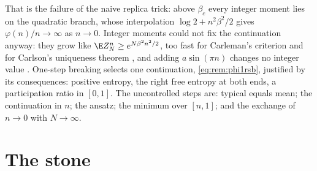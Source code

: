 \begin{refsection}
That is the failure of the naive replica trick: above $\beta_c$ every integer moment lies on the quadratic branch, whose interpolation $\log2+n^2\beta^2/2$ gives $\varphi(n)/n\to\infty$ as $n\to0$. Integer moments could not fix the continuation anyway: they grow like $\E Z_N^n\ge e^{N\beta^2n^2/2}$, too fast for Carleman's criterion and for Carlson's uniqueness theorem \parencite{OgureKabashima2009a}, and adding $a\sin(\pi n)$ changes no integer value \parencite{Tanaka2007}. One-step breaking selects one continuation, \eqref{eq:rem:phi1rsb}, justified by its consequences: positive entropy, the right free entropy at both ends, a participation ratio in $[0,1]$. The uncontrolled steps are: typical equals mean; the continuation in $n$; the ansatz; the minimum over $[n,1]$; and the exchange of $n\to0$ with $N\to\infty$.

\section{The stone}\label{sec:rem:stone}


\end{refsection}
